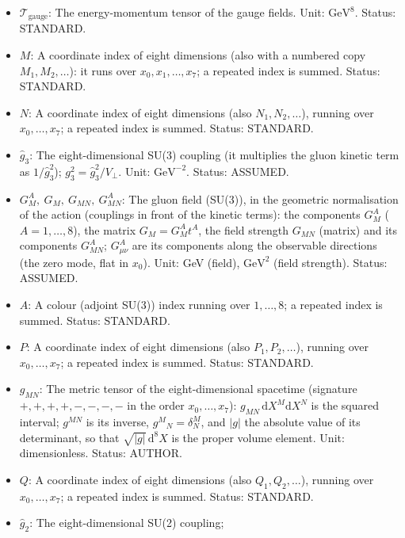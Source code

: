 \documentclass[
  10pt,
]{article}
\providecommand{\tightlist}{%
  \setlength{\itemsep}{0pt}\setlength{\parskip}{0pt}}
\begin{document}
\begin{itemize}
\tightlist
\item
  \(\mathcal{T}_{\mathrm{gauge}}\): The energy-momentum tensor of the
  gauge fields. Unit: \(\mathrm{GeV}^{8}\). Status: STANDARD.
\item
  \(M\): A coordinate index of eight dimensions (also with a numbered
  copy \(M_1, M_2, \dots\)): it runs over \(x_0, x_1, \dots, x_7\); a
  repeated index is summed. Status: STANDARD.
\item
  \(N\): A coordinate index of eight dimensions (also
  \(N_1, N_2, \dots\)), running over \(x_0, \dots, x_7\); a repeated
  index is summed. Status: STANDARD.
\item
  \(\hat g_3\): The eight-dimensional SU(3) coupling (it multiplies the
  gluon kinetic term as \(1/\hat g_3^2\));
  \(g_3^2 = \hat g_3^2/V_\perp\). Unit: \(\mathrm{GeV}^{-2}\). Status:
  ASSUMED.
\item
  \(G^A_M,\ G_M,\ G_{MN},\ G^A_{MN}\): The gluon field (SU(3)), in the
  geometric normalisation of the action (couplings in front of the
  kinetic terms): the components \(G^A_M\) (\(A = 1, \dots, 8\)), the
  matrix \(G_M = G^A_Mt^A\), the field strength \(G_{MN}\) (matrix) and
  its components \(G^A_{MN}\); \(G^A_{\mu\nu}\) are its components along
  the observable directions (the zero mode, flat in \(x_0\)). Unit: GeV
  (field), \(\mathrm{GeV}^{2}\) (field strength). Status: ASSUMED.
\item
  \(A\): A colour (adjoint SU(3)) index running over \(1, \dots, 8\); a
  repeated index is summed. Status: STANDARD.
\item
  \(P\): A coordinate index of eight dimensions (also
  \(P_1, P_2, \dots\)), running over \(x_0, \dots, x_7\); a repeated
  index is summed. Status: STANDARD.
\item
  \(g_{MN}\): The metric tensor of the eight-dimensional spacetime
  (signature \(+,+,+,+,-,-,-,-\) in the order \(x_0, \dots, x_7\)):
  \(g_{MN}\,\mathrm{d}X^M\mathrm{d}X^N\) is the squared interval;
  \(g^{MN}\) is its inverse, \(g^M{}_N = \delta^M_N\), and
  \(\lvert g\rvert\) the absolute value of its determinant, so that
  \(\sqrt{\lvert g\rvert}\,\mathrm{d}^8X\) is the proper volume element.
  Unit: dimensionless. Status: AUTHOR.
\item
  \(Q\): A coordinate index of eight dimensions (also
  \(Q_1, Q_2, \dots\)), running over \(x_0, \dots, x_7\); a repeated
  index is summed. Status: STANDARD.
\item
  \(\hat g_2\): The eight-dimensional SU(2) coupling;

\end{itemize}
\end{document}
